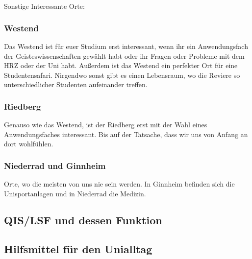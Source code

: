 \documentclass[12pt,a4paper]{article}
\begin{document}
			\ \\\\ 
			Sonstige Interessante Orte:\\
		
		\subsubsection{Westend}
			Das Westend ist für euer Studium erst interessant, wenn ihr ein Anwendungsfach der Geisteswissenschaften gewählt habt oder ihr Fragen oder Probleme mit dem HRZ oder der Uni habt. Außerdem ist das Westend ein perfekter Ort für eine Studentensafari. Nirgendwo sonst gibt es einen Lebensraum, wo die Reviere so unterschiedlicher Studenten aufeinander treffen. \\
		
		\subsubsection{Riedberg}
			Genauso wie das Westend, ist der Riedberg erst mit der Wahl eines Anwendungsfaches interessant. Bis auf der Tatsache, dass wir uns von Anfang an dort wohlfühlen.
		\subsubsection{Niederrad und Ginnheim}
			Orte, wo die meisten von uns nie sein werden. In Ginnheim befinden sich die Unisportanlagen und in Niederrad die Medizin.
	
		
	\subsection{QIS/LSF und dessen Funktion}
	\subsection{Hilfsmittel für den Unialltag}
\end{document}
